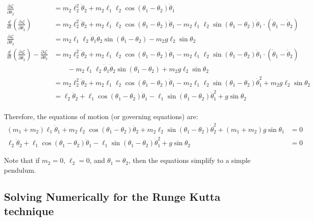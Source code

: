 \documentclass[letterpaper,8pt]{article}
\begin{document}
\begin{align*}
\frac{\partial \mathcal{L}}{\partial \dot{\theta}_2} &= m_2 \ell_2^2 \dot{\theta}_2 + m_2\ell_1\ell_2 \cos(\theta_1 - \theta_2) \dot{\theta}_1 \\
\frac{d}{dt} \left( \frac{\partial \mathcal{L}}{\partial \dot{\theta}_2} \right) &= m_2 \ell_2^2 \ddot{\theta}_2 
    + m_2\ell_1\ell_2 \cos(\theta_1 - \theta_2) \ddot{\theta}_1 - m_2\ell_1\ell_2 \sin (\theta_1 - \theta_2) \dot{\theta}_1 \cdot (\dot{\theta}_1 - \dot{\theta}_2) \\
\frac{\partial \mathcal{L}}{\partial \theta_2} &= m_2 \ell_1\ell_2 \dot{\theta}_1 \dot{\theta}_2 \sin (\theta_1 - \theta_2) - m_2 g \ell_2 \sin \theta_2 \\
\frac{d}{dt} \left( \frac{\partial \mathcal{L}}{\partial \dot{\theta}_2} \right) - \frac{\partial \mathcal{L}}{\partial \theta_2} &= 
       m_2 \ell_2^2 \ddot{\theta}_2 + m_2\ell_1\ell_2 \cos(\theta_1 - \theta_2) \ddot{\theta}_1 - m_2\ell_1\ell_2 \sin (\theta_1 - \theta_2) \dot{\theta}_1 \cdot (\dot{\theta}_1 - \dot{\theta}_2) \\
  &\qquad - m_2 \ell_1\ell_2 \dot{\theta}_1 \dot{\theta}_2 \sin (\theta_1 - \theta_2) + m_2 g \ell_2 \sin \theta_2 \\
  &= m_2 \ell_2^2 \ddot{\theta}_2 + m_2\ell_1\ell_2 \cos(\theta_1 - \theta_2) \ddot{\theta}_1 - m_2 \ell_1\ell_2 \sin (\theta_1 - \theta_2) \dot{\theta}_1^2 
       + m_2 g \ell_2 \sin \theta_2 \\
  &= \ell_2 \ddot{\theta}_2 + \ell_1 \cos(\theta_1 - \theta_2) \ddot{\theta}_1 - \ell_1 \sin (\theta_1 - \theta_2) \dot{\theta}_1^2 + g \sin \theta_2 \\
\end{align*}

Therefore, the equations of motion (or governing equations) are:
\begin{align*}
(m_1 + m_2)\ell_1 \ddot{\theta}_1 + m_2 \ell_2 \cos (\theta_1 - \theta_2) \ddot{\theta}_2
          + m_2\ell_2 \sin (\theta_1 - \theta_2) \dot{\theta}_2^2 + (m_1 + m_2) g \sin \theta_1 &= 0 \\
  \ell_2 \ddot{\theta}_2 + \ell_1 \cos(\theta_1 - \theta_2) \ddot{\theta}_1 - \ell_1 \sin (\theta_1 - \theta_2) \dot{\theta}_1^2 + g \sin \theta_2 &= 0 
\end{align*}

Note that if $m_2 = 0$, $\ell_2 = 0$, and $\theta_1 = \theta_2$, then the equations simplify to a simple pendulum.

\subsection{Solving Numerically for the Runge Kutta technique}
\end{document}
